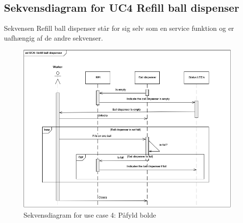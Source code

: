 \documentclass[Arkitektur/System_main.tex]{subfiles}
\begin{document}
\subsection{Sekvensdiagram for UC4 Refill ball dispenser} \label{sec:ssd_UC4}
Sekvensen Refill ball dispenser står for sig selv som en service funktion og er uafhængig af de andre sekvenser. 
\begin{figure}[H]
    \centering
    \includegraphics[scale=0.9]{Arkitektur/Sekvensdiagrammer/graphics/sd_UC4.png}
    \caption{Sekvensdiagram for use case 4: Påfyld bolde}
    \label{fig:sd_UC4}
\end{figure}
\end{document}
